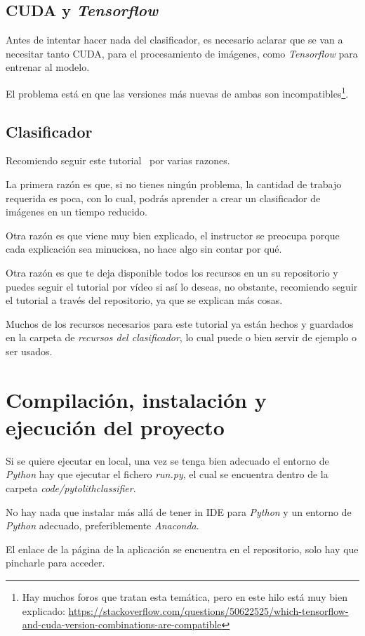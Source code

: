 \subsection{CUDA y \textit{Tensorflow}}
Antes de intentar hacer nada del clasificador, es necesario aclarar que se van a necesitar tanto CUDA, para el procesamiento de imágenes, como \textit{Tensorflow} para entrenar al modelo.

El problema está en que las versiones más nuevas de ambas son incompatibles\footnote{Hay muchos foros que tratan esta temática, pero en este hilo está muy bien explicado: \url{https://stackoverflow.com/questions/50622525/which-tensorflow-and-cuda-version-combinations-are-compatible}}.

\subsection{Clasificador}
Recomiendo seguir este tutorial~\cite{git} por varias razones.

La primera razón es que, si no tienes ningún problema, la cantidad de trabajo requerida es poca, con lo cual, podrás aprender a crear un clasificador de imágenes en un tiempo reducido.

Otra razón es que viene muy bien explicado, el instructor se preocupa porque cada explicación sea minuciosa, no hace algo sin contar por qué.

Otra razón es que te deja disponible todos los recursos en un su repositorio y puedes seguir el tutorial por vídeo si así lo deseas, no obstante, recomiendo seguir el tutorial a través del repositorio, ya que se explican más cosas.

Muchos de los recursos necesarios para este tutorial ya están hechos y guardados en la carpeta de \textit{recursos del clasificador}, lo cual puede o bien servir de ejemplo o ser usados.
\section{Compilación, instalación y ejecución del proyecto}
Si se quiere ejecutar en local, una vez se tenga bien adecuado el entorno de \textit{Python} hay que ejecutar el fichero \textit{run.py}, el cual se encuentra dentro de la carpeta \textit{code/pytolithclassifier}.

No hay nada que instalar más allá de tener in IDE para \textit{Python} y un entorno de \textit{Python} adecuado, preferiblemente \textit{Anaconda}.

El enlace de la página de la aplicación se encuentra en el repositorio, solo hay que pincharle para acceder.

